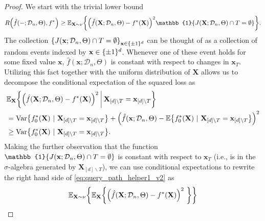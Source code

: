 \documentclass[11pt]{article}
\newcommand{\bx}{\mathbf{x}}
\newcommand{\bX}{\mathbf{X}}
\DeclarePairedDelimiter{\braces}{\lbrace}{\rbrace}
\DeclarePairedDelimiter{\paren}{(}{)}
\newcommand{\E}{\mathbb{E}}
\newcommand{\indicator}{\mathbb{1}}
\newcommand{\Var}{\operatorname{Var}}
\newcommand{\binspace}{\braces{\pm 1}^\nfeats}
\newcommand{\xmeasure}{\nu}
\newcommand{\nfeats}{d}
\newcommand{\coordindices}{[\nfeats]}
\newcommand{\data}[1][n]{\mathcal{D}_{#1}}
\newcommand{\suppset}{S^*}
\newcommand{\traversal}{T}
\begin{document}
\begin{proof}
    We start with the trivial lower bound
    \begin{equation} \label{eq:query_path_helper1_v2}
        R\paren*{\hat f(-;\data,\Theta),f^*} \geq \E_{\bX\sim\xmeasure}\braces*{\paren*{\hat f(\bX;\data,\Theta) - f^*(\bX)}^2\indicator\braces*{J(\bX;\data,\Theta)\cap \traversal = \emptyset }}.
    \end{equation}
    The collection $\braces*{J(\bx;\data,\Theta)\cap \traversal = \emptyset }_{\bx \in \binspace}$ can be thought of as a collection of random events indexed by $\bx \in \binspace$.
    Whenever one of these event holds for some fixed value $\bx$, $\hat f(\bx;\data,\Theta)$ is constant with respect to changes in $\bx_{\traversal}$.
    Utilizing this fact together with the uniform distribution of $\bX$ allows us to decompose the conditional expectation of the squared loss as
    \begin{equation} \label{eq:query_path_helper2_v2}
    \begin{split}
        & \E_{\bX}\braces*{\paren*{\hat f(\bX;\data,\Theta) - f^*(\bX)}^2~
            \vline~\bX_{\coordindices\backslash\traversal} = \bx_{\coordindices\backslash\traversal}} \\
            &= \Var\braces*{f_0^*(\bX)~|~\bX_{\coordindices\backslash\traversal} = \bx_{\coordindices\backslash\traversal}} + \paren*{\hat f(\bx;\data,\Theta) - \E\braces*{f_0^*(\bX)~|~\bX_{\coordindices\backslash\traversal} = \bx_{\coordindices\backslash\traversal}}}^2 \\
            &\geq \Var\braces*{f_0^*(\bX)~|~\bX_{\coordindices\backslash\traversal} = \bx_{\coordindices\backslash\traversal}}.
    \end{split}
    \end{equation}
    Making the further observation that the function $\indicator\braces*{J(\bx;\data,\Theta)\cap \traversal = \emptyset }$ is constant with respect to $\bx_{\traversal}$ (i.e., is in the $\sigma$-algebra generated by $\bX_{\coordindices\backslash\traversal}$), 
    we can use conditional expectations to rewrite the right hand side of \eqref{eq:query_path_helper1_v2} as
    \begin{equation}
        \E_{\bX\sim\xmeasure}\braces*{\E_{\bX}\braces*{\paren*{\hat f(\bX;\data,\Theta) - f^*(\bX)}^2~
}}
\end{equation}
\end{proof}
\end{document}
